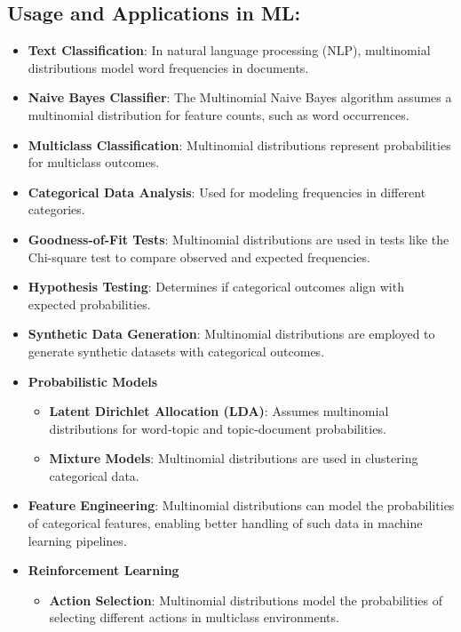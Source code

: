 \subsection*{Usage and Applications in ML:}
\begin{itemize}
    \item \textbf{Text Classification}: In natural language processing (NLP), multinomial distributions model word frequencies in documents.
    \item \textbf{Naive Bayes Classifier}: The Multinomial Naive Bayes algorithm assumes a multinomial distribution for feature counts, such as word occurrences.
    \item \textbf{Multiclass Classification}: Multinomial distributions represent probabilities for multiclass outcomes.
    \item \textbf{Categorical Data Analysis}: Used for modeling frequencies in different categories.
    \item \textbf{Goodness-of-Fit Tests}: Multinomial distributions are used in tests like the Chi-square test to compare observed and expected frequencies.
    \item \textbf{Hypothesis Testing}: Determines if categorical outcomes align with expected probabilities.
    \item \textbf{Synthetic Data Generation}: Multinomial distributions are employed to generate synthetic datasets with categorical outcomes.
    \item \textbf{Probabilistic Models}
    \begin{itemize}
        \item \textbf{Latent Dirichlet Allocation (LDA)}: Assumes multinomial distributions for word-topic and topic-document probabilities.
        \item \textbf{Mixture Models}: Multinomial distributions are used in clustering categorical data.
    \end{itemize}
    \item \textbf{Feature Engineering}: Multinomial distributions can model the probabilities of categorical features, enabling better handling of such data in machine learning pipelines.
    \item \textbf{Reinforcement Learning}
    \begin{itemize}
        \item \textbf{Action Selection}: Multinomial distributions model the probabilities of selecting different actions in multiclass environments.
    \end{itemize}

\end{itemize}
